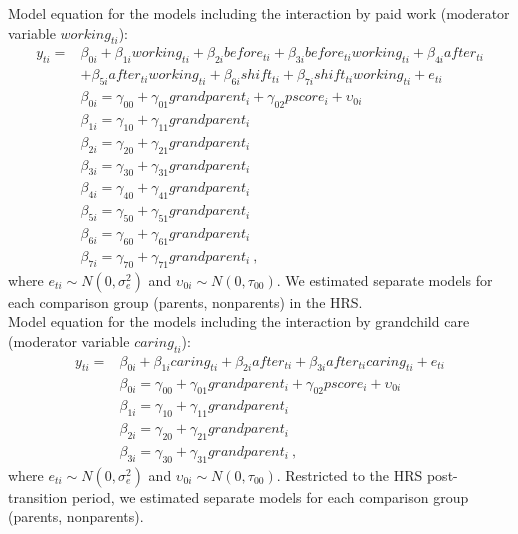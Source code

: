 \documentclass[
  english,
  man, noextraspace]{apa7}
\begin{document}
\begin{appendix}
Model equation for the models including the interaction by paid work
(moderator variable \(working_{ti}\)): \begin{equation}
\begin{split}
y_{ti} =& \beta_{0i} + \beta_{1i}working_{ti} + \beta_{2i}before_{ti} + \beta_{3i}before_{ti}working_{ti} + \beta_{4i}after_{ti} \\
& + \beta_{5i}after_{ti}working_{ti} + \beta_{6i}shift_{ti} + \beta_{7i}shift_{ti}working_{ti} + e_{ti} \\
& \beta_{0i} = \gamma_{00} + \gamma_{01}grandparent_i + \gamma_{02}pscore_i + \upsilon_{0i} \\
& \beta_{1i} = \gamma_{10} + \gamma_{11}grandparent_i \\
& \beta_{2i} = \gamma_{20} + \gamma_{21}grandparent_i \\
& \beta_{3i} = \gamma_{30} + \gamma_{31}grandparent_i \\
& \beta_{4i} = \gamma_{40} + \gamma_{41}grandparent_i \\
& \beta_{5i} = \gamma_{50} + \gamma_{51}grandparent_i \\
& \beta_{6i} = \gamma_{60} + \gamma_{61}grandparent_i \\
& \beta_{7i} = \gamma_{70} + \gamma_{71}grandparent_i\ ,
\end{split}
\label{eq:mlm3}
\end{equation} where \(e_{ti} \sim N(0, \sigma_e^2)\) and
\(\upsilon_{0i} \sim N(0, \tau_{00})\). We estimated separate models for
each comparison group (parents, nonparents) in the HRS.\\
Model equation for the models including the interaction by grandchild
care (moderator variable \(caring_{ti}\)): \begin{equation}
\begin{split}
y_{ti} =& \beta_{0i} + \beta_{1i}caring_{ti} + \beta_{2i}after_{ti} + \beta_{3i}after_{ti}caring_{ti} + e_{ti} \\
& \beta_{0i} = \gamma_{00} + \gamma_{01}grandparent_i + \gamma_{02}pscore_i + \upsilon_{0i} \\
& \beta_{1i} = \gamma_{10} + \gamma_{11}grandparent_i \\
& \beta_{2i} = \gamma_{20} + \gamma_{21}grandparent_i \\
& \beta_{3i} = \gamma_{30} + \gamma_{31}grandparent_i\ ,
\end{split}
\label{eq:mlm4}
\end{equation} where \(e_{ti} \sim N(0, \sigma_e^2)\) and
\(\upsilon_{0i} \sim N(0, \tau_{00})\). Restricted to the HRS
post-transition period, we estimated separate models for each comparison
group (parents, nonparents).


\end{appendix}
\end{document}
